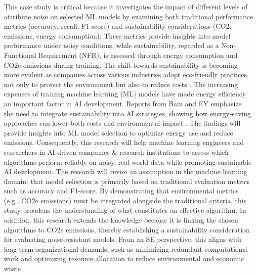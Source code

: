 \documentclass[conference]{IEEEtran}
\begin{document}
This case study is critical because it investigates the impact of different levels of attribute noise on selected ML models by examining both traditional performance metrics (accuracy, recall, F1 score) and sustainability considerations (CO2e emissions, energy consumption). These metrics provide insights into model performance under noisy conditions, while sustainability, regarded as a Non-Functional Requirement (NFR), is assessed through energy consumption and CO2e emissions during training.
\newline
\newline
The shift towards sustainability is becoming more evident as companies across various industries adopt eco-friendly practices, not only to protect the environment but also to reduce costs \cite{ey_ai_sustainability}. The increasing expenses of training machine learning (ML) models have made energy efficiency an important factor in AI development. Reports from Bain and EY emphasize the need to integrate sustainability into AI strategies, showing how energy-saving approaches can lower both costs and environmental impact \cite{bain_ai_sustainability}. 
\newline
\newline
The findings will provide insights into ML model selection to optimize energy use and reduce emissions. Consequently, this research will help machine learning engineers and researchers in AI-driven companies \& research institutions to assess which algorithms perform reliably on noisy, real-world data while promoting sustainable AI development.
\newline
\newline
The research will revise an assumption in the machine learning domain: that model selection is primarily based on traditional evaluation metrics such as accuracy and F1-score. By demonstrating that environmental metrics (e.g., CO2e emissions) must be integrated alongside the traditional criteria, this study broadens the understanding of what constitutes an effective algorithm. In addition, this research extends the knowledge because it is linking the chosen algorithms to CO2e emissions, thereby establishing a sustainability consideration for evaluating noise-resistant models. From an SE perspective, this aligns with long-term organizational demands, such as minimizing redundant computational work and optimizing resource allocation to reduce environmental and economic waste \cite[pp. 290-291]{sweb}.

\end{document}
